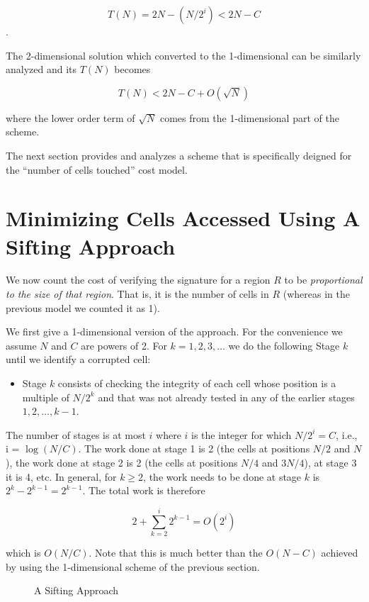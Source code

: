 \documentclass{llncs}
\begin{document}
$$T(N) = 2N - (N/2^i) < 2N - C$$.

The 2-dimensional solution which converted to the 1-dimensional
can be similarly analyzed and its $T(N)$ becomes

$$T(N) < 2N - C + O( \sqrt{N} )$$

\noindent where the lower order term of $\sqrt{N}$ comes
from the 1-dimensional part of the scheme.

The next section provides and analyzes a scheme that is 
specifically deigned for the ``number of cells touched''
cost model.

\section{Minimizing Cells Accessed Using A Sifting Approach}
\label{SiftingApproach}
We now count the cost of verifying the signature for a region $R$ 
to be {\em proportional to the size of that region}. 
That is, it is the number of cells in $R$ (whereas in the previous model we counted it as 1).


We first give a 1-dimensional version of the approach.
For the convenience we assume $N$ and $C$ are powers of 2.
For $k = 1 , 2, 3 , \ldots$ we do the following 
Stage $k$ until we identify a corrupted cell:

\begin{itemize}
\item
Stage $k$ consists of checking the integrity of 
each cell whose position is a multiple of $N/2^k$
and that was not already tested in any of
the earlier stages $1 , 2 , \ldots , k-1$.
\end{itemize}

The number of stages is at most $i$ where
$i$ is the integer for which 
$N/2^i = C$, i.e., i = $\log ( N / C )$.
The work done at stage 1 is 2 (the cells at 
positions $N/2$ and $N$), the work done at stage 2 is 2
(the cells at positions $N/4$ and $3N/4$), at stage 3
it is 4, etc.  In general,
for $k \geq 2$, the work needs to be done at stage $k$ is $2^k - 2^{k-1} = 2^{k-1}$.
The total work is therefore

$$2 + \sum_{k=2}^i 2^{k-1} = O( 2^i )$$

\noindent which is $O( N / C )$.  Note that this
is much better than the $O( N-C )$ achieved by using
the 1-dimensional scheme of the previous section.

\begin{figure*}
\centerline{\subfigure[Stage $k$=1]{\texttt{[image: 1]}
\label{fig_1}}
\hfil
\subfigure[Stage $k$=2]{\texttt{[image: 2]}
\label{fig_2}}
\hfil
\subfigure[Stage $k$=3]{\texttt{[image: 3]}
\label{fig_3}}
\hfil
\subfigure[A corrupted oval green area is detected at stage $k$=4 ]{\texttt{[image: 5]}
\label{fig_5}}}
\caption{A Sifting Approach}
\label{fig_shifting}
\end{figure*}
\end{document}
